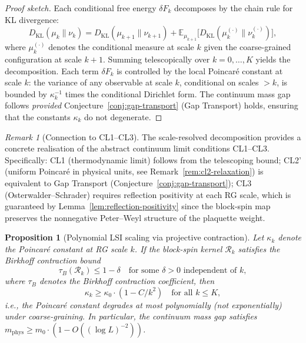 \documentclass[12pt,a4paper]{article}
\theoremstyle{definition}
\theoremstyle{plain}
\newtheorem{proposition}[definition]{Proposition}
\theoremstyle{remark}
\newtheorem{remark}[definition]{Remark}
\begin{document}
\begin{proof}[Proof sketch]
Each conditional free energy $\delta F_k$ decomposes by the chain rule for KL divergence:
\[
D_{\mathrm{KL}}(\mu_k \| \nu_k) = D_{\mathrm{KL}}(\mu_{k+1} \| \nu_{k+1}) + \mathbb{E}_{\mu_{k+1}}\!\bigl[D_{\mathrm{KL}}(\mu_k^{(\cdot)} \| \nu_k^{(\cdot)})\bigr],
\]
where $\mu_k^{(\cdot)}$ denotes the conditional measure at scale $k$ given the coarse-grained configuration at scale $k+1$. Summing telescopically over $k = 0, \ldots, K$ yields the decomposition. Each term $\delta F_k$ is controlled by the local Poincar\'e constant at scale $k$: the variance of any observable at scale $k$, conditional on scales $> k$, is bounded by $\kappa_k^{-1}$ times the conditional Dirichlet form. The continuum mass gap follows \emph{provided} Conjecture~\ref{conj:gap-transport} (Gap Transport) holds, ensuring that the constants $\kappa_k$ do not degenerate.
\end{proof}

\begin{remark}[Connection to CL1--CL3]
\label{rem:hierarchical-cl}
The scale-resolved decomposition provides a concrete realisation of the abstract continuum limit conditions CL1--CL3. Specifically: CL1 (thermodynamic limit) follows from the telescoping bound; CL2' (uniform Poincar\'e in physical units, see Remark~\ref{rem:cl2-relaxation}) is equivalent to Gap Transport (Conjecture~\ref{conj:gap-transport}); CL3 (Osterwalder--Schrader) requires reflection positivity at each RG scale, which is guaranteed by Lemma~\ref{lem:reflection-positivity} since the block-spin map preserves the nonnegative Peter--Weyl structure of the plaquette weight.
\end{remark}

\begin{proposition}[Polynomial LSI scaling via projective contraction]
\label{prop:polynomial-lsi}
Let $\kappa_k$ denote the Poincar\'e constant at RG scale $k$. If the block-spin kernel $\mathcal{R}_k$ satisfies the Birkhoff contraction bound
\[
\tau_B(\mathcal{R}_k) \leq 1 - \delta \quad \text{for some } \delta > 0 \text{ independent of } k,
\]
where $\tau_B$ denotes the Birkhoff contraction coefficient, then
\[
\kappa_k \geq \kappa_0 \cdot (1 - C/k^2) \quad \text{for all } k \leq K,
\]
i.e., the Poincar\'e constant degrades at most polynomially (not exponentially) under coarse-graining. In particular, the continuum mass gap satisfies $m_{\mathrm{phys}} \geq m_0 \cdot (1 - O((\log L)^{-2}))$.
\end{proposition}
\end{document}
